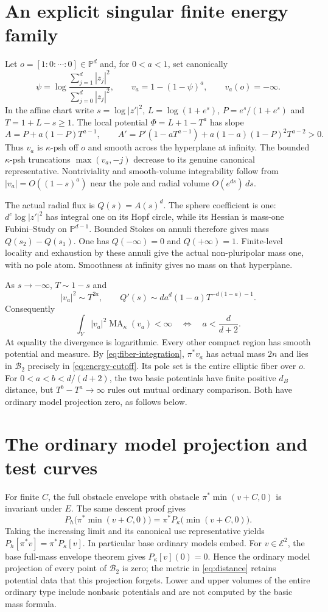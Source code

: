 \documentclass[11pt]{article}
\newcommand{\MA}{\operatorname{MA}}
\newcommand{\PP}{\mathbb P}
\newcommand{\BB}{\mathcal B}
\theoremstyle{remark}\newtheorem{remark}[theorem]{Remark}
\begin{document}
\section{An explicit singular finite energy family}
Let $o=[1:0:\cdots:0]\in\PP^d$ and, for $0<a<1$, set canonically
\[
 \psi=\log\frac{\sum_{j=1}^d|z_j|^2}{\sum_{j=0}^d|z_j|^2},
 \qquad v_a=1-(1-\psi)^a,\qquad v_a(o)=-\infty.
\]
In the affine chart write $s=\log|z'|^2$,
$L=\log(1+e^s)$, $P=e^s/(1+e^s)$ and $T=1+L-s\geq1$.
The local potential $\Phi=L+1-T^a$ has slope
\[
 A=P+a(1-P)T^{a-1},\qquad
 A'=P'(1-aT^{a-1})+a(1-a)(1-P)^2T^{a-2}>0.
\]
Thus $v_a$ is $\kappa$-psh off $o$ and smooth across the hyperplane
at infinity. The bounded $\kappa$-psh truncations $\max(v_a,-j)$
decrease to its genuine canonical representative. Nontriviality and
smooth-volume integrability follow from $|v_a|=O((1-s)^a)$ near the
pole and radial volume $O(e^{ds})\,ds$.

The actual radial flux is $Q(s)=A(s)^d$. The sphere coefficient is one:
$d^c\log|z'|^2$ has integral one on its Hopf circle, while its Hessian
is mass-one Fubini--Study on $\PP^{d-1}$. Bounded Stokes on annuli
therefore gives mass $Q(s_2)-Q(s_1)$. One has $Q(-\infty)=0$ and
$Q(+\infty)=1$. Finite-level locality and exhaustion by these annuli
give the actual non-pluripolar mass one, with no pole atom. Smoothness
at infinity gives no mass on that hyperplane.

As $s\to-\infty$, $T\sim1-s$ and
\[
 |v_a|^2\sim T^{2a},\qquad
 Q'(s)\sim d a^d(1-a)T^{-d(1-a)-1}.
\]
Consequently
\begin{equation}\label{eq:energy-cutoff}
 \int_Y|v_a|^2\MA_\kappa(v_a)<\infty
       \quad\Longleftrightarrow\quad a<\frac{d}{d+2}.
\end{equation}
At equality the divergence is logarithmic. Every other compact region
has smooth potential and measure. By \eqref{eq:fiber-integration},
$\pi^*v_a$ has actual mass $2n$ and lies in $\BB_2$ precisely in
\eqref{eq:energy-cutoff}. Its pole set is the entire elliptic fiber over $o$.
For $0<a<b<d/(d+2)$, the two basic potentials have finite positive
$d_B$ distance, but $T^b-T^a\to\infty$ rules out mutual ordinary
comparison. Both have ordinary model projection zero, as follows below.

\section{The ordinary model projection and test curves}
For finite $C$, the full obstacle envelope with obstacle
$\pi^*\min(v+C,0)$ is invariant under $E$. The same descent proof gives
\[
 P_h\bigl(\pi^*\min(v+C,0)\bigr)
       =\pi^*P_\kappa\bigl(\min(v+C,0)\bigr).
\]
Taking the increasing limit and its canonical usc representative yields
$P_h[\pi^*v]=\pi^*P_\kappa[v]$. In particular base ordinary models
embed. For $v\in\mathcal E^2$, the base full-mass envelope theorem
\cite[Theorem 4.3]{Darvas} gives $P_\kappa[v](0)=0$. Hence the
ordinary model projection of every point of $\BB_2$ is zero; the
metric in \eqref{eq:distance} retains potential data that this projection
forgets. Lower and upper volumes of the entire ordinary type include
nonbasic potentials and are not computed by the basic mass formula.
\end{document}
